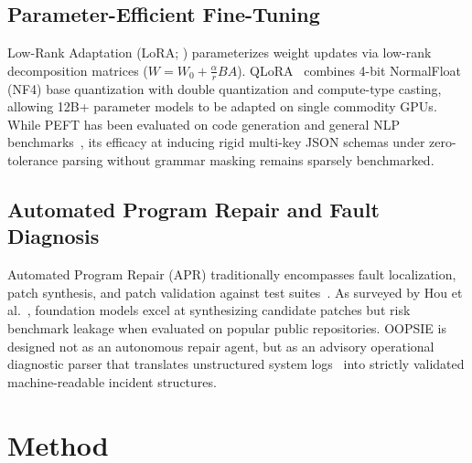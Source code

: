 \documentclass[11pt,a4paper]{article}
\begin{document}
\subsection{Parameter-Efficient Fine-Tuning}
Low-Rank Adaptation (LoRA; \cite{hu2022lora}) parameterizes weight updates via low-rank decomposition matrices ($W = W_0 + \frac{\alpha}{r}BA$). QLoRA~\cite{dettmers2023qlora} combines 4-bit NormalFloat (NF4) base quantization with double quantization and compute-type casting, allowing 12B+ parameter models to be adapted on single commodity GPUs. While PEFT has been evaluated on code generation and general NLP benchmarks~\cite{roziere2023codellama,li2023starcoder}, its efficacy at inducing rigid multi-key JSON schemas under zero-tolerance parsing without grammar masking remains sparsely benchmarked.

\subsection{Automated Program Repair and Fault Diagnosis}
Automated Program Repair (APR) traditionally encompasses fault localization, patch synthesis, and patch validation against test suites~\cite{zhang2024apr}. As surveyed by Hou et al.~\cite{hou2024llmse}, foundation models excel at synthesizing candidate patches but risk benchmark leakage when evaluated on popular public repositories. OOPSIE is designed not as an autonomous repair agent, but as an advisory operational diagnostic parser that translates unstructured system logs~\cite{kent2006sp80092} into strictly validated machine-readable incident structures.

\section{Method}
\end{document}
